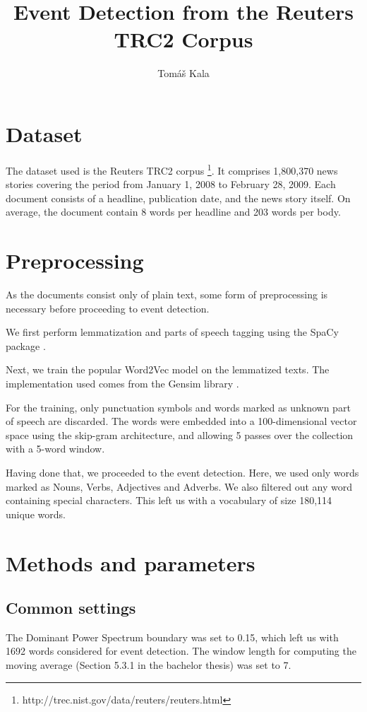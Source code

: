 \documentclass[a4paper]{article}
\title{Event Detection from the Reuters TRC2 Corpus}
\author{Tomáš Kala}
\begin{document}
\maketitle

\section{Dataset}
The dataset used is the Reuters TRC2 corpus \footnote{http://trec.nist.gov/data/reuters/reuters.html}. It comprises 1,800,370 news stories covering the period from January 1, 2008 to February 28, 2009. Each document consists of a headline, publication date, and the news story itself. On average, the document contain 8 words per headline and 203 words per body.


\section{Preprocessing}
As the documents consist only of plain text, some form of preprocessing is necessary before proceeding to event detection.

We first perform lemmatization and parts of speech tagging using the SpaCy package \cite{spacy}.

Next, we train the popular Word2Vec model \cite{word2vec} on the lemmatized texts. The implementation used comes from the Gensim library \cite{gensim}.

For the training, only punctuation symbols and words marked as unknown part of speech are discarded. The words were embedded into a 100-dimensional vector space using the skip-gram architecture, and allowing 5 passes over the collection with a 5-word window.

Having done that, we proceeded to the event detection. Here, we used only words marked as Nouns, Verbs, Adjectives and Adverbs. We also filtered out any word containing special characters. This left us with a vocabulary of size 180,114 unique words.


\section{Methods and parameters}

\subsection{Common settings}
The Dominant Power Spectrum boundary was set to 0.15, which left us with 1692 words considered for event detection. The window length for computing the moving average (Section 5.3.1 in the bachelor thesis) was set to 7.
\end{document}
